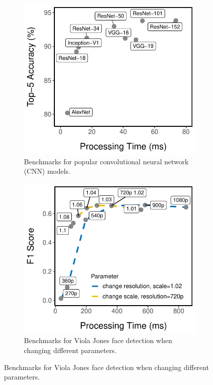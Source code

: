 \begin{figure}
  \centering
  \begin{subfigure}[t]{0.45\textwidth}
    \centering
    \includegraphics[width=\textwidth]{figures/motiv-functions.pdf}
    \caption{Benchmarks for popular convolutional neural network (CNN) models.}
    \label{fig:motiv-functions}
  \end{subfigure}
  \hfill
  \begin{subfigure}[t]{0.45\textwidth}
    \centering
    \includegraphics[width=\textwidth]{figures/motiv-params.pdf}
    \caption{Benchmarks for Viola Jones face detection when changing different
      parameters.}
    \label{fig:motiv-params}
  \end{subfigure}
\end{figure}

